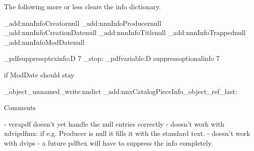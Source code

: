 The following more or less clears the info dictionary.

\pdfmanagement_add:nnn{Info}{Creator}{null}
\pdfmanagement_add:nnn{Info}{Producer}{null}
\pdfmanagement_add:nnn{Info}{CreationDate}{null}
\pdfmanagement_add:nnn{Info}{Title}{null}
\pdfmanagement_add:nnn{Info}{Trapped}{null}
\pdfmanagement_add:nnn{Info}{ModDate}{null}

\tex_pdfsuppressptexinfo:D 7 \scan_stop: %
\tex_pdfvariable:D suppressoptionalinfo 7\relax %

if ModDate should stay

\pdf_object_unnamed_write:nn{dict}{}
\pdfmanagement_add:nnx{Catalog}{PieceInfo}{\pdf_object_ref_last:}


Comments

- verapdf doesn't yet handle the null entries correctly 
- doesn't work with xdvipdfmx: if e.g. Producer is null it fills it with the standard text.
- doesn't work with dvips
- a future pdftex will have  \pdfomitinfodict to suppress the info completely.


